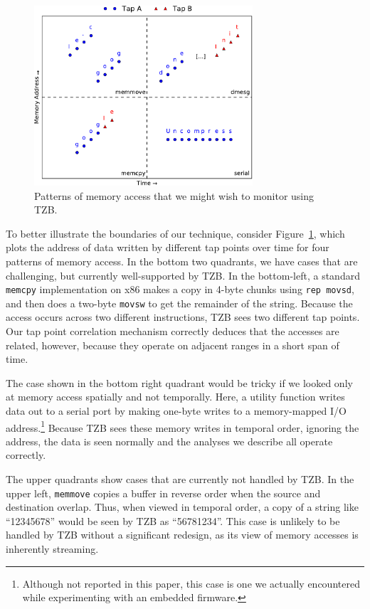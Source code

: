 \begin{figure}[t]
    \begin{center}
        \includegraphics[width=3.2in]{figures/memaccess.pdf}
    \end{center}
    \caption{Patterns of memory access that we might wish to monitor
    using TZB.}
    \label{fig:memaccess}
\end{figure}

To better illustrate the boundaries of our technique, consider
Figure~\ref{fig:memaccess}, which plots the address of data written by
different tap points over time for four patterns of memory access. In
the bottom two quadrants, we have cases that are challenging, but
currently well-supported by TZB. In the bottom-left, a standard
\texttt{memcpy} implementation on x86 makes a copy in 4-byte chunks
using \texttt{rep movsd}, and then does a two-byte \texttt{movsw} to get
the remainder of the string. Because the access occurs across two
different instructions, TZB sees two different tap points. Our tap point
correlation mechanism correctly deduces that the accesses are related,
however, because they operate on adjacent ranges in a short span of
time.

The case shown in the bottom right quadrant would be tricky if we looked
only at memory access spatially and not temporally. Here, a utility
function writes data out to a serial port by making one-byte writes to a
memory-mapped I/O address.\footnote{Although not reported in this paper,
this case is one we actually encountered while experimenting with an
embedded firmware.} Because TZB sees these memory writes in
temporal order, ignoring the address, the data is seen normally and the
analyses we describe all operate correctly.

The upper quadrants show cases that are currently not handled by TZB. In
the upper left, \texttt{memmove} copies a buffer in reverse order when
the source and destination overlap. Thus, when viewed in temporal order,
a copy of a string like ``12345678'' would be seen by TZB as
``56781234''. This case is unlikely to be handled by TZB without a
significant redesign, as its view of memory accesses is inherently
streaming.


